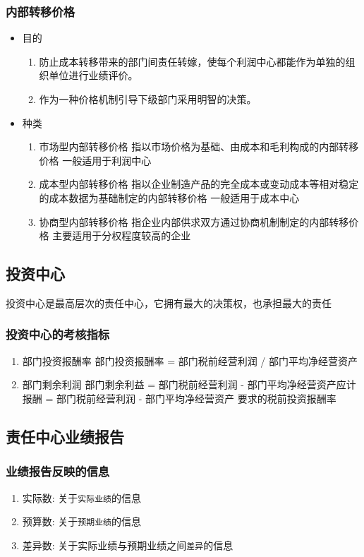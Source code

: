 \documentclass[11pt]{article}
\begin{document}
\subsubsection{内部转移价格}
\label{sec:orgabbcb3a}
\begin{itemize}
\item 目的
\begin{enumerate}
\item 防止成本转移带来的部门间责任转嫁，使每个利润中心都能作为单独的组织单位进行业绩评价。
\item 作为一种价格机制引导下级部门采用明智的决策。
\end{enumerate}
\item 种类
\begin{enumerate}
\item 市场型内部转移价格
指以市场价格为基础、由成本和毛利构成的内部转移价格
一般适用于利润中心
\item 成本型内部转移价格
指以企业制造产品的完全成本或变动成本等相对稳定的成本数据为基础制定的内部转移价格
一般适用于成本中心
\item 协商型内部转移价格
指企业内部供求双方通过协商机制制定的内部转移价格
主要适用于分权程度较高的企业
\end{enumerate}
\end{itemize}
\subsection{投资中心}
\label{sec:org5d6a225}
投资中心是最高层次的责任中心，它拥有最大的决策权，也承担最大的责任
\subsubsection{投资中心的考核指标}
\label{sec:org8496f6e}
\begin{enumerate}
\item 部门投资报酬率
\label{sec:org228e25e}
部门投资报酬率 = 部门税前经营利润 / 部门平均净经营资产
\item 部门剩余利润
\label{sec:org0960f68}
部门剩余利益 = 部门税前经营利润 - 部门平均净经营资产应计报酬 = 部门税前经营利润 - 部门平均净经营资产 \texttimes{} 要求的税前投资报酬率
\end{enumerate}
\subsection{责任中心业绩报告}
\label{sec:org8bffbba}
\subsubsection{业绩报告反映的信息}
\label{sec:org6eb70f6}
\begin{enumerate}
\item 实际数: 关于\texttt{实际业绩}的信息
\item 预算数: 关于\texttt{预期业绩}的信息
\item 差异数: 关于实际业绩与预期业绩之间\texttt{差异}的信息
\end{enumerate}
\end{document}
